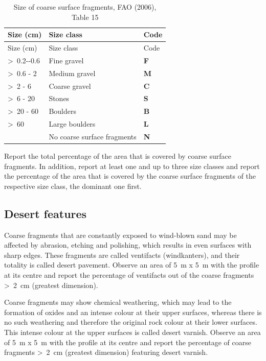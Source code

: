 \documentclass[
  letterpaper,
  DIV=11,
  numbers=noendperiod]{scrreprt}
\begin{document}
\begin{longtable}[]{@{}lll@{}}
\caption{Size of coarse surface fragments, FAO (2006), Table
15}\tabularnewline
\toprule()
Size (cm) & Size class & Code \\
\midrule()
\endfirsthead
\toprule()
Size (cm) & Size class & Code \\
\midrule()
\endhead
\textgreater~0.2-\/-0.6 & Fine gravel & \textbf{F} \\
\textgreater~0.6 - 2 & Medium gravel & \textbf{M} \\
\textgreater~2 - 6 & Coarse gravel & \textbf{C} \\
\textgreater~6 - 20 & Stones & \textbf{S} \\
\textgreater~20 - 60 & Boulders & \textbf{B} \\
\textgreater~60 & Large boulders & \textbf{L} \\
& No coarse surface fragments & \textbf{N} \\
\bottomrule()
\end{longtable}

Report the total percentage of the area that is covered by coarse
surface fragments. In addition, report at least one and up to three size
classes and report the percentage of the area that is covered by the
coarse surface fragments of the respective size class, the dominant one
first.

\hypertarget{desert-features}{%
\subsection{Desert features}\label{desert-features}}

Coarse fragments that are constantly exposed to wind-blown sand may be
affected by abrasion, etching and polishing, which results in even
surfaces with sharp edges. These fragments are called ventifacts
(windkanters), and their totality is called desert pavement. Observe an
area of 5~m x 5~m with the profile at its centre and report the
percentage of ventifacts out of the coarse fragments \textgreater~2~cm
(greatest dimension).

Coarse fragments may show chemical weathering, which may lead to the
formation of oxides and an intense colour at their upper surfaces,
whereas there is no such weathering and therefore the original rock
colour at their lower surfaces. This intense colour at the upper
surfaces is called desert varnish. Observe an area of 5~m x 5~m with the
profile at its centre and report the percentage of coarse fragments
\textgreater~2~cm (greatest dimension) featuring desert varnish.
\end{document}
